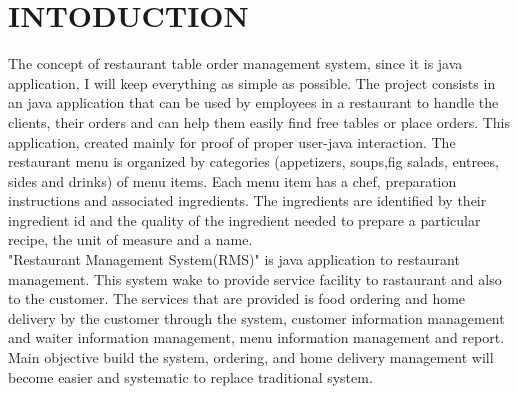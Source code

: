 \documentclass[12pt,a4paper]{article}
\begin{document}
	

	
	\tableofcontents
	\newpage
	\listoffigures
	\listoftables
	
	\newpage
	
	
	\section{INTODUCTION}
	The concept of restaurant table order management system, since it is java application, I will keep everything as simple as possible. The project consists in an java application that can be used by employees in a restaurant to handle the clients, their orders and can help them easily find free tables or place orders. This application, created mainly for proof of proper user-java interaction. The restaurant menu is organized by categories (appetizers, soups,fig salads, entrees, sides and drinks) of menu items. Each menu item has a chef, preparation instructions and associated ingredients. The ingredients are identified by their ingredient id and the quality of the ingredient needed to prepare a particular recipe, the unit of measure and a name.
        \\
        "Restaurant Management System(RMS)" is java application to restaurant management. This system wake to provide service facility to rastaurant and also to the customer. The services that are provided is food ordering and home delivery by the customer through the system, customer information management and waiter information management, menu information management and report. Main objective build the system, ordering, and home delivery management will become easier and systematic to replace traditional system.

	
\end{document}
